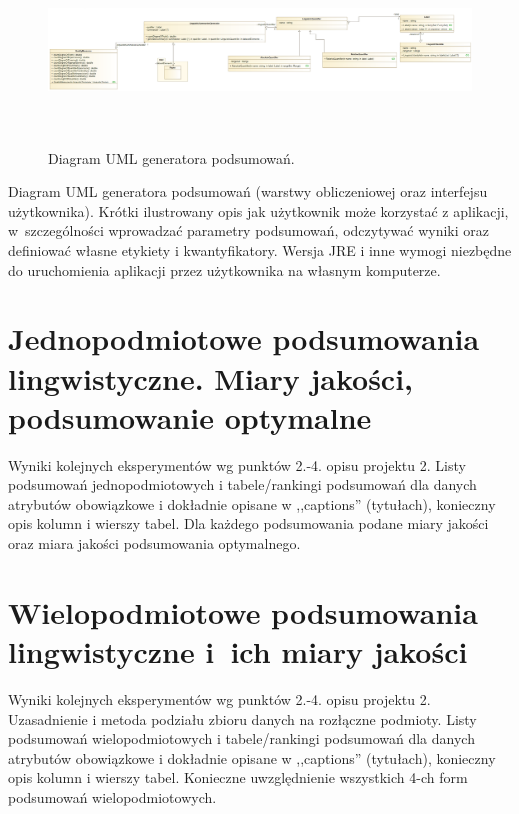 \documentclass{classrep}
\begin{document}
\begin{figure}[H]
    \centering
    \includegraphics[width=14cm, height=5cm]{generator.png}
    \caption{Diagram UML generatora podsumowań.}
    \label{rysunek:generator}
\end{figure}

Diagram UML generatora podsumowań (warstwy obliczeniowej oraz interfejsu
użytkownika). Krótki ilustrowany opis jak użytkownik może korzystać z aplikacji, w~szczególności
wprowadzać parametry  podsumowań, odczytywać wyniki oraz definiować własne etykiety i
kwantyfikatory. Wersja JRE i inne wymogi niezbędne do uruchomienia aplikacji przez użytkownika na własnym komputerze. \\

\section{ Jednopodmiotowe podsumowania lingwistyczne. Miary jakości, podsumowanie optymalne}
Wyniki kolejnych eksperymentów wg punktów 2.-4. opisu projektu 2.  Listy podsumowań
jednopodmiotowych i tabele/rankingi podsumowań dla danych atrybutów obowiązkowe i dokładnie opisane w ,,captions'' (tytułach), konieczny opis kolumn i wierszy tabel. Dla każdego podsumowania podane miary jakości oraz miara jakości podsumowania
optymalnego.\\



\section{Wielopodmiotowe podsumowania lingwistyczne i~ich miary jakości} 
Wyniki kolejnych eksperymentów wg punktów 2.-4. opisu projektu 2. Uzasadnienie i
metoda podziału zbioru danych na rozłączne podmioty. Listy podsumowań
wielopodmiotowych i tabele/rankingi podsumowań dla danych atrybutów obowiązkowe i
dokładnie opisane w ,,captions'' (tytułach), konieczny opis kolumn i wierszy tabel.
Konieczne uwzględnienie wszystkich 4-ch form podsumowań wielopodmiotowych. 
\\ 
\end{document}
